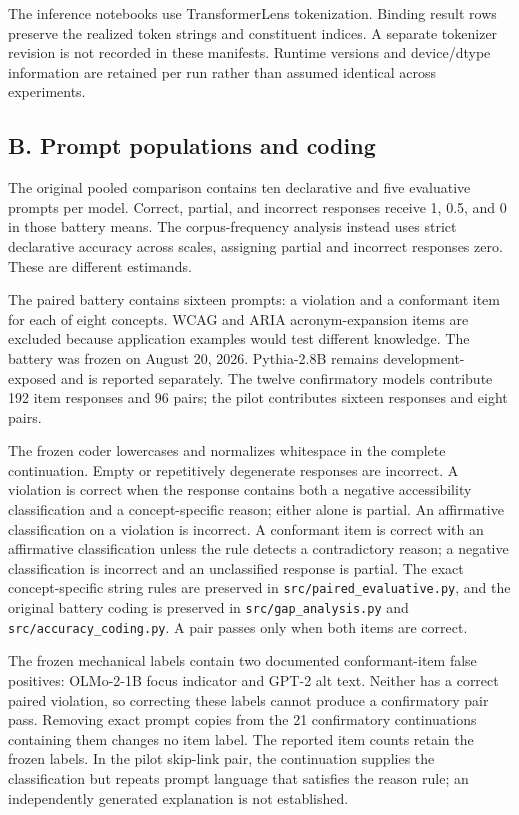 \documentclass[
  english,
]{article}
\begin{document}
The inference notebooks use TransformerLens tokenization. Binding result rows preserve the realized token strings and constituent indices. A separate tokenizer revision is not recorded in these manifests. Runtime versions and device/dtype information are retained per run rather than assumed identical across experiments.

\subsection{B. Prompt populations and coding}\label{b.-prompt-populations-and-coding}

The original pooled comparison contains ten declarative and five evaluative prompts per model. Correct, partial, and incorrect responses receive 1, 0.5, and 0 in those battery means. The corpus-frequency analysis instead uses strict declarative accuracy across scales, assigning partial and incorrect responses zero. These are different estimands.

The paired battery contains sixteen prompts: a violation and a conformant item for each of eight concepts. WCAG and ARIA acronym-expansion items are excluded because application examples would test different knowledge. The battery was frozen on August 20, 2026. Pythia-2.8B remains development-exposed and is reported separately. The twelve confirmatory models contribute 192 item responses and 96 pairs; the pilot contributes sixteen responses and eight pairs.

The frozen coder lowercases and normalizes whitespace in the complete continuation. Empty or repetitively degenerate responses are incorrect. A violation is correct when the response contains both a negative accessibility classification and a concept-specific reason; either alone is partial. An affirmative classification on a violation is incorrect. A conformant item is correct with an affirmative classification unless the rule detects a contradictory reason; a negative classification is incorrect and an unclassified response is partial. The exact concept-specific string rules are preserved in \texttt{src/paired\_evaluative.py}, and the original battery coding is preserved in \texttt{src/gap\_analysis.py} and \texttt{src/accuracy\_coding.py}. A pair passes only when both items are correct.

The frozen mechanical labels contain two documented conformant-item false positives: OLMo-2-1B focus indicator and GPT-2 alt text. Neither has a correct paired violation, so correcting these labels cannot produce a confirmatory pair pass. Removing exact prompt copies from the 21 confirmatory continuations containing them changes no item label. The reported item counts retain the frozen labels. In the pilot skip-link pair, the continuation supplies the classification but repeats prompt language that satisfies the reason rule; an independently generated explanation is not established.
\end{document}
